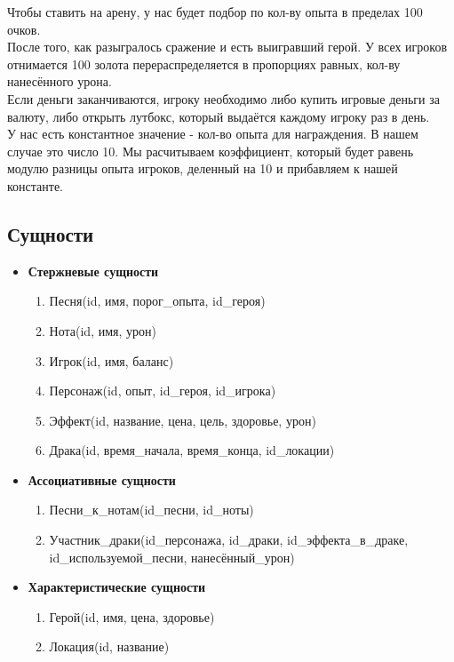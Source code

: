 Чтобы ставить на арену, у нас будет подбор по кол-ву опыта в пределах 100 очков.\\
    
После того, как разыгралось сражение и есть выигравший герой. У всех игроков отнимается 100 золота перераспределяется в пропорциях равных, кол-ву нанесённого урона. \\

Если деньги заканчиваются, игроку необходимо либо купить игровые деньги за валюту, либо открыть лутбокс, который выдаётся каждому игроку раз в день. \\

У нас есть константное значение - кол-во опыта для награждения. В нашем случае это число 10. Мы расчитываем коэффициент, который будет равень модулю разницы опыта игроков, деленный на 10 и прибавляем к нашей константе.

\subsection*{Сущности}


\begin{itemize}
\item \textbf{Стержневые сущности}
\begin{enumerate}
    \item Песня(id, имя, порог\_опыта, id\_героя)
    \item Нота(id, имя, урон)
    \item Игрок(id, имя, баланс)
    \item Персонаж(id, опыт, id\_героя, id\_игрока)
    \item Эффект(id, название, цена, цель, здоровье, урон)
    \item Драка(id, время\_начала, время\_конца, id\_локации)
\end{enumerate}

\item \textbf{Ассоциативные сущности}
\begin{enumerate}
    \item Песни\_к\_нотам(id\_песни, id\_ноты)
    \item Участник\_драки(id\_персонажа, id\_драки, id\_эффекта\_в\_драке, id\_используемой\_песни, нанесённый\_урон)
\end{enumerate}

\item \textbf{Характеристические сущности}
\begin{enumerate}
    \item Герой(id, имя, цена, здоровье)
    \item Локация(id, название)
\end{enumerate}
\end{itemize}


